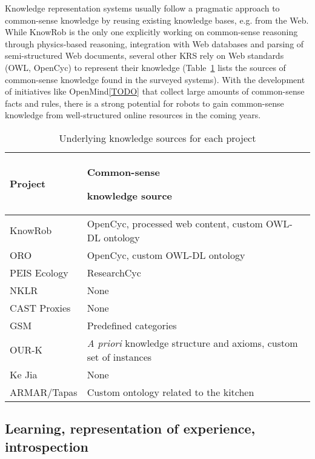 \documentclass[journal]{IEEEtran}
\begin{document}
Knowledge representation systems usually follow a pragmatic approach to
common-sense knowledge by reusing existing knowledge bases, e.g. from the 
Web. While {\sc KnowRob} is the only one explicitly working on common-sense 
reasoning through physics-based reasoning, integration with Web databases and 
parsing of semi-structured Web documents, several other KRS rely on Web 
standards (OWL, OpenCyc) to represent their knowledge (Table~\ref{table|knowledge-sources} 
lists the sources of common-sense knowledge found in the surveyed systems). With the
development of initiatives like OpenMind\ref{TODO} that collect large amounts 
of common-sense facts and rules, there is a strong potential for robots to gain
common-sense knowledge from well-structured online resources in the coming
years.

\begin{table}
\begin{center}

\begin{tabular}{lp{4cm}}
\toprule
{\bf Project} & {\bf Common-sense \par knowledge source} \\
\midrule
{\sc KnowRob} & {\sc OpenCyc}, processed web content, custom OWL-DL ontology \\
ORO & {\sc OpenCyc}, custom OWL-DL ontology \\
PEIS Ecology & {\sc ResearchCyc} \\
NKLR &  None \\
CAST Proxies &  None \\
GSM &  Predefined categories \\
OUR-K & {\it A priori} knowledge structure and axioms, custom set of instances\\
Ke Jia & None \\
ARMAR/{\sc Tapas} & Custom ontology related to the kitchen\\

\bottomrule

\end{tabular}
\end{center}
\caption{Underlying knowledge sources for each project}
\label{table|knowledge-sources}
\end{table}


\subsection{Learning, representation of experience, introspection}
\end{document}
